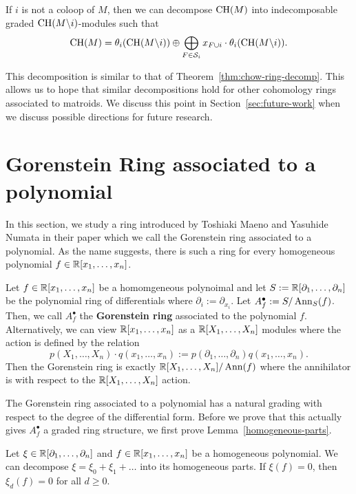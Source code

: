 \documentclass{puthesis-UG}
\begin{document}
\begin{thm} \label{thm:augmented-chow-ring-krull-schmidt-decomp}
	If $i$ is not a coloop of $M$, then we can decompose $\operatorname{CH}(M)$ into indecomposable graded $\operatorname{CH}(M \backslash i)$-modules such that 
	\[
		\operatorname{CH}(M) = \theta_i (\operatorname{CH}(M \backslash i)) \oplus \bigoplus_{F \in \mathcal{S}_i} x_{F \cup i} \cdot \theta_i (\operatorname{CH}(M \backslash i)).
	\]
\end{thm}

This decomposition is similar to that of Theorem~\ref{thm:chow-ring-decomp}. This allows us to hope that similar decompositions hold for other cohomology rings associated to matroids. We discuss this point in Section~\ref{sec:future-work} when we discuss possible directions for future research. 

\section{Gorenstein Ring associated to a polynomial}

In this section, we study a ring introduced by Toshiaki Maeno and Yasuhide Numata in their paper \cite{MN-gorenstein} which we call the Gorenstein ring associated to a polynomial. As the name suggests, there is such a ring for every homogeneous polynomial $f \in \mathbb{R} [x_1, \ldots, x_n]$. 

\begin{defn}
	Let $f \in \mathbb{R}[x_1, \ldots, x_n]$ be a homomgeneous polynoimal and let $S := \mathbb{R}[\partial_1, \ldots, \partial_n]$ be the polynomial ring of differentials where $\partial_i := \partial_{x_i}$. Let $A_f^\bullet := S / \operatorname{Ann}_S (f)$. Then, we call $A_f^\bullet$ the \textbf{Gorenstein ring} associated to the polynomial $f$. Alternatively, we can view $\mathbb{R}[x_1, \ldots, x_n]$ as a $\mathbb{R}[X_1, \ldots, X_n]$ modules where the action is defined by the relation
	\[
		p(X_1, \ldots, X_n) \cdot q(x_1, \ldots, x_n) := p(\partial_1, \ldots, \partial_n) q(x_1, \ldots, x_n). 
	\]
	Then the Gorenstein ring is exactly $\mathbb{R}[X_1, \ldots, X_n] / \operatorname{Ann} (f)$ where the annihilator is with respect to the $\mathbb{R}[X_1, \ldots, X_n]$ action. 
\end{defn}

The Gorenstein ring associated to a polynomial has a natural grading with respect to the degree of the differential form. Before we prove that this actually gives $A_f^\bullet$ a graded ring structure, we first prove Lemma~\ref{homogeneous-parts}.

\begin{lem} \label{homogeneous-parts}
	Let $\xi \in \mathbb{R}[\partial_1, \ldots, \partial_n]$ and $f \in \mathbb{R}[x_1, \ldots, x_n]$ be a homogeneous polynomial. We can decompose $\xi = \xi_0 + \xi_1 + \ldots$ into its homogeneous parts. If $\xi (f) = 0$, then $\xi_d (f) = 0$ for all $d \geq 0$. 
\end{lem}
\end{document}
